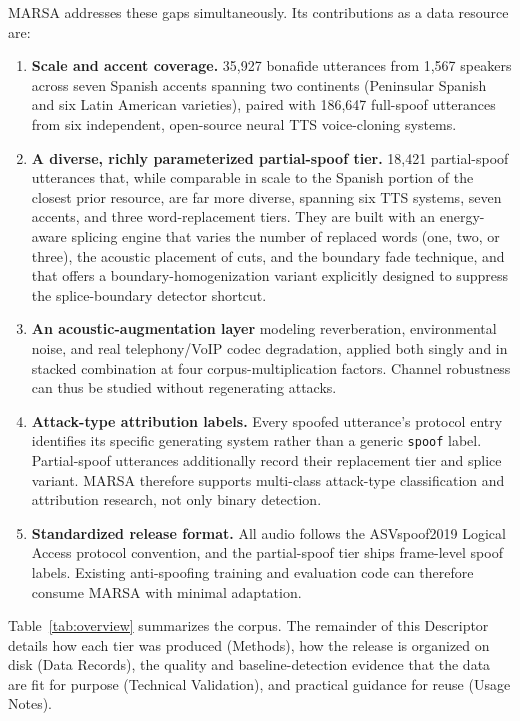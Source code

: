 \documentclass[11pt]{article}
\begin{document}
MARSA addresses these gaps simultaneously. Its contributions as a data resource are:
\begin{enumerate}
  \item \textbf{Scale and accent coverage.} 35{,}927 bonafide
  utterances from 1{,}567 speakers across seven Spanish accents spanning
  two continents (Peninsular Spanish and six Latin American varieties),
  paired with 186{,}647 full-spoof utterances from six independent,
  open-source neural TTS voice-cloning systems.
  \item \textbf{A diverse, richly parameterized partial-spoof tier.}
  18{,}421 partial-spoof utterances that, while comparable in scale to
  the Spanish portion of the closest prior resource, are far more
  diverse, spanning six TTS systems, seven accents, and three
  word-replacement tiers. They are built with an energy-aware splicing
  engine that varies the number of replaced words (one, two, or three),
  the acoustic placement of cuts, and the boundary fade technique, and
  that offers a boundary-homogenization variant explicitly designed to
  suppress the splice-boundary detector shortcut.
  \item \textbf{An acoustic-augmentation layer} modeling reverberation,
  environmental noise, and real telephony/VoIP codec degradation, applied
  both singly and in stacked combination at four corpus-multiplication
  factors. Channel robustness can thus be studied without regenerating
  attacks.
  \item \textbf{Attack-type attribution labels.} Every spoofed
  utterance's protocol entry identifies its specific generating system
  rather than a generic \texttt{spoof} label. Partial-spoof utterances
  additionally record their replacement tier and splice variant. MARSA
  therefore supports multi-class attack-type classification and
  attribution research, not only binary detection.
  \item \textbf{Standardized release format.} All audio follows the
  ASVspoof2019 Logical Access protocol convention, and the partial-spoof
  tier ships frame-level spoof labels. Existing anti-spoofing training
  and evaluation code can therefore consume MARSA with minimal
  adaptation.
\end{enumerate}

Table~\ref{tab:overview} summarizes the corpus. The remainder of this
Descriptor details how each tier was produced (Methods), how the release
is organized on disk (Data Records), the quality and baseline-detection
evidence that the data are fit for purpose (Technical Validation), and
practical guidance for reuse (Usage Notes).
\end{document}
